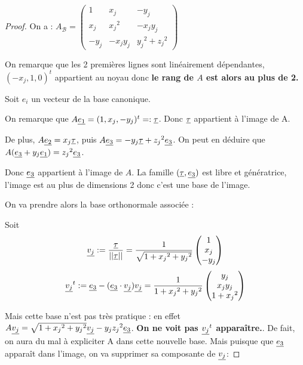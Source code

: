 \begin{proof}
  On a : $A_\mathcal{B} = \begin{pmatrix} 1 & {x_j} & -{y_j} \\ {x_j} & {x_j}^2 & -{x_jy_j} \\ -{y_j} & -{x_jy_j} & {y_j}^2 + {z_j}^2\end{pmatrix}$

  On remarque que les 2 premières lignes sont linéairement dépendantes, $(-{x_j}, 1, 0)^t$ appartient au noyau donc \textbf{le rang de $A$ est alors au plus de 2.}

  Soit $e_i$ un vecteur de la base canonique.

  On remarque que $A\underline{e_1} = ( 1, {x_j} , -{y_j})^t =: \underline{\tau}$. Donc $\underline{\tau}$ appartient à l'image de A.

  De plus, $A\underline{e_2} = {x_j}\underline{\tau}$, puis $A\underline{e_3} = -{y_j}\underline{\tau}+{z_j}^2\underline{e_3}$. On peut en déduire que $A(\underline{e_3} + {y_j} \underline{e_1}) = {z_j}^2 \underline{e_3}$. 

  Donc $\underline{e_3}$ appartient à l'image de $A$. La famille $(\underline{\tau},\underline{e_3})$ est libre et génératrice, l'image est au plus de dimensions 2 donc c'est une base de l'image.

  On va prendre alors la base orthonormale associée : 

  Soit \[
  {\underline{v_j}} := \dfrac{\underline{\tau}}{||\underline{\tau}||} = \dfrac{1}{\sqrt{1 + {x_j}^2 +{y_j}^2}}\begin{pmatrix} 1\\{x_j}\\-{y_j}\end{pmatrix}\]
  \[{\underline{v_j}}^t := \underline{e_3} - (\underline{e_3}\cdot {\underline{v_j}}){\underline{v_j}} = \dfrac{1}{1+{x_j}^2+{y_j}^2}\begin{pmatrix} {y_j} \\ {x_jy_j} \\ 1 + {x_j}^2\end{pmatrix}\]

  Mais cette base n'est pas très pratique : en effet $A\underline{v_j} = \sqrt{1+{x_j}^2+{y_j}^2} {\underline{v_j}} - {y_j} {z_j}^2 \underline{e_3}$. \textbf{On ne voit pas ${\underline{v_j}}^t$ apparaître.}. De fait, on aura du mal à expliciter A dans cette nouvelle base. Mais puisque que $\underline{e_3}$ apparaît dans l'image, on va supprimer sa composante de ${\underline{v_j}}$:


\end{proof}
